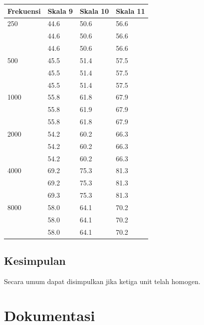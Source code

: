 \documentclass{article} %
\begin{document}
	\begin{table}[!ht]
		\begin{tabular}{|l|l|l|l|}
			\hline
			\textbf{Frekuensi}	& \textbf{Skala 9} & \textbf{Skala 10} & \textbf{Skala 11} \\ \hline
			250	& 44.6 & 50.6 & 56.6 \\ \hline
				& 44.6 & 50.6 & 56.6 \\ \hline
				& 44.6 & 50.6 & 56.6 \\ \hline \hline
			500	& 45.5 & 51.4 & 57.5 \\ \hline
				& 45.5 & 51.4 & 57.5 \\ \hline
				& 45.5 & 51.4 & 57.5 \\ \hline \hline
			1000& 55.8 & 61.8 & 67.9 \\ \hline
				& 55.8 & 61.9 & 67.9 \\ \hline
				& 55.8 & 61.8 & 67.9 \\ \hline \hline
			2000& 54.2 & 60.2 & 66.3 \\ \hline
				& 54.2 & 60.2 & 66.3 \\ \hline
				& 54.2 & 60.2 & 66.3 \\ \hline \hline
			4000& 69.2 & 75.3 & 81.3 \\ \hline
				& 69.2 & 75.3 & 81.3 \\ \hline
				& 69.3 & 75.3 & 81.3 \\ \hline \hline
			8000& 58.0 & 64.1 & 70.2 \\ \hline
				& 58.0 & 64.1 & 70.2 \\ \hline
				& 58.0 & 64.1 & 70.2 \\ \hline \hline
		\end{tabular}
	\end{table}

	\subsection{Kesimpulan}

	Secara umum dapat disimpulkan jika ketiga unit telah homogen.

	\newpage

	\section{Dokumentasi}
\end{document}
